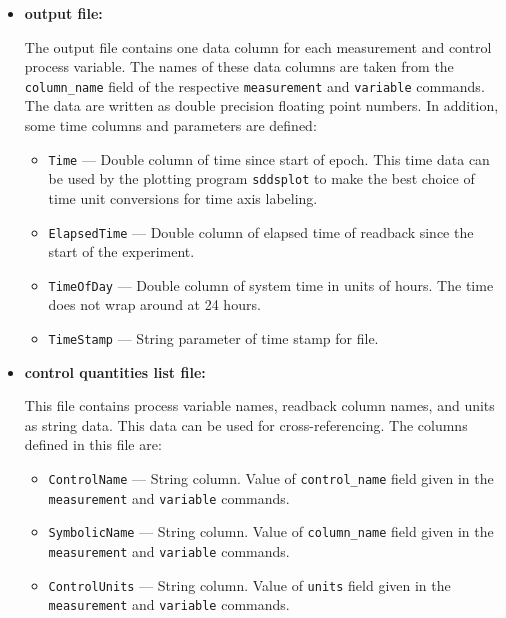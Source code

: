 \begin{itemize}
\begin{itemize}
\newpage
\item {\bf output file:}\par
The output file contains one data column for each measurement and control process variable.
The names of these data columns are taken from the \verb+column_name+ field of the
respective \verb+measurement+ and \verb+variable+ commands. The data are written
as double precision floating point numbers. 
In addition, some time columns and parameters are defined:
\begin{itemize}
        \item {\tt Time} --- Double column of time since start of epoch. This time data can be used by
        the plotting program {\verb+sddsplot+} to make the best choice of time unit conversions
        for time axis labeling.
        \item {\tt ElapsedTime} --- Double column of elapsed time of readback since the start of the experiment.
        \item {\tt TimeOfDay} --- Double column of system time in units of hours. 
                The time does not wrap around at 24 hours.
        \item {\tt TimeStamp} --- String parameter of time stamp for file.
\end{itemize}

\item {\bf control quantities list file:}\par
        This file contains process variable names, readback column names, and units as string data. 
        This data can be used for cross-referencing. The columns defined in this file are:
\begin{itemize}
        \item {\tt ControlName} --- String column. Value of \verb+control_name+ field given in the 
                \verb+measurement+ and \verb+variable+ commands.
        \item {\tt SymbolicName} --- String column. Value of \verb+column_name+ field given in the 
                \verb+measurement+ and \verb+variable+ commands.
        \item {\tt ControlUnits} --- String column.  Value of \verb+units+ field given in the 
                \verb+measurement+ and \verb+variable+ commands.
\end{itemize}
\end{itemize}



\end{itemize}

